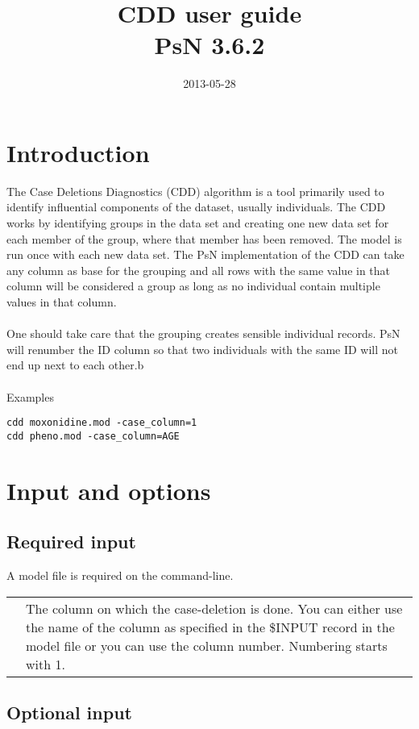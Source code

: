 \documentclass[a4paper,12pt]{article}
\title{CDD user guide\\ \vspace{2 mm} {\large PsN 3.6.2}}
\date{2013-05-28}
\begin{document}
\maketitle


\section{Introduction}
The Case Deletions Diagnostics (CDD) algorithm is a tool primarily used to identify influential components of the dataset, usually individuals. The CDD works by identifying groups in the data set and creating one new data set for each member of the group, where that member has been removed. The model is run once with each new data set. The PsN implementation of the CDD can take any column as base for the grouping and all rows with the same value in that column will be considered a group as long as no individual contain multiple values in that column.
\\
\\
One should take care that the grouping creates sensible individual records. PsN will renumber the ID column so that two individuals with the same ID will not end up next to each other.b
\\
\\
Examples
\begin{verbatim}
cdd moxonidine.mod -case_column=1
cdd pheno.mod -case_column=AGE
\end{verbatim}

\section{Input and options}

\subsection{Required input}
A model file is required on the command-line.

\begin{longtable}{p{1in}p{4in}}
\verb%-case_column=<name|number>% & \\
\nopagebreak
 & The column on which the case-deletion is done. You can either use the name of the column as specified in the \mbox{\$INPUT} record in the model file or you can use the column number. Numbering starts with 1.
\end{longtable}

\subsection{Optional input}
\end{document}
